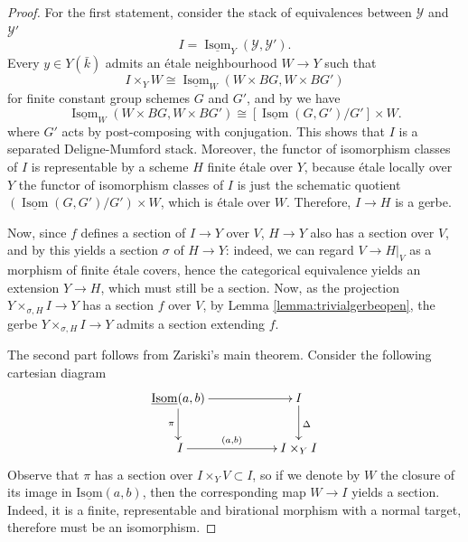 \documentclass{amsart}
\newcommand{\cY}{\mathcal{Y}}
\newcommand{\Isom}{\operatorname{Isom}}
\theoremstyle{definition}
\newcommand{\marg}[1]{\normalsize{{\color{red}\footnote{{\color{blue}#1}}}{\marginpar[{\color{red}\hfill\tiny\thefootnote$\rightarrow$}]{{\color{red}$\leftarrow$\tiny\thefootnote}}}}}
\newcommand{\Sid}[1]{\marg{(Sid) #1}}
\begin{document}
\begin{proof}


For the first statement, consider the stack of equivalences between $\cY$ and $\cY'$
$$I=\underline{\Isom}_Y(\cY,\cY').$$ 
Every $y\in Y(\bar{k})$ admits an \'etale neighbourhood  $W\to Y$ such that  
$$I\times_Y W \cong \underline{\Isom}_W(W\times BG,W\times BG')$$
for finite constant group schemes $G$ and $G'$, and by \cite[Lem. 3.9]{AOV_tame} we have
$$\underline{\Isom}_W(W\times BG,W\times BG')\cong [\underline{\Isom}(G,G')/G']\times W.$$ 
where $G'$ acts by post-composing with conjugation. This shows that $I$ is a separated Deligne-Mumford stack. Moreover, the functor of isomorphism classes 
of $I$ is representable by a scheme $H$ finite \'etale over $Y$, because \'{e}tale locally over $Y$ the functor of isomorphism classes of $I$ is just the schematic quotient $(\underline{\Isom}(G,G')/G') \times W$, which is \'{e}tale over $W$. Therefore, $I\to H$ is a gerbe.

Now, since $f$ defines a section of $I\to Y$ over $V$, $H\to Y$ also has a section over $V$, and by  this yields a section $\sigma$ of $H\to Y$: indeed, we can regard $V\to H|_V$ as a morphism of finite \'{e}tale covers, hence the categorical equivalence yields an extension $Y\to H$, which must still be a section. Now, as the projection $Y\times_{\sigma, H} I \to Y$ has a section $f$ over $V$, by Lemma \ref{lemma:trivialgerbeopen}, the gerbe $Y\times_{\sigma, H} I \to Y$ admits a section extending $f$.  %

The second part follows from Zariski's main theorem. Consider the following cartesian diagram
$$\xymatrix{\underline{\mathrm{Isom}}(a,b) \ar[d]_\pi \ar[rr] & & I \ar[d]^\Delta \\\ I\ar[rr]^-{(a,b)} && I\times_Y I}$$
Observe that $\pi$ has a section over $I \times_Y V \subset I$, so if we denote by $W$ the closure of its image in $\underline{\mathrm{Isom}}(a,b)$, then the corresponding map $W\to I$ yields a section. Indeed, it is a finite, representable and birational morphism with a normal target, therefore must be an isomorphism. 
\end{proof}
\end{document}
